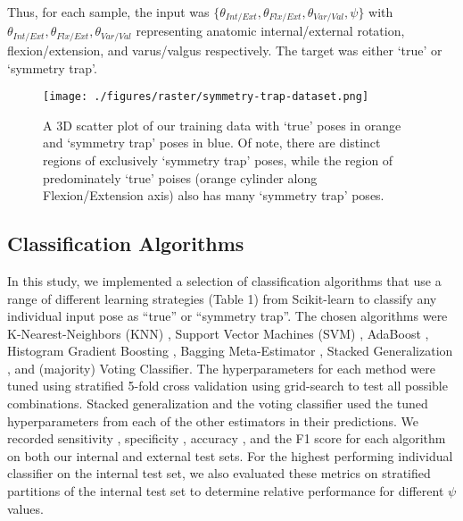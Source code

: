 Thus, for each sample, the input was $\{\theta_{Int/Ext}, \theta_{Flx/Ext}, \theta_{Var/Val}, \psi\}$ with $\theta_{Int/Ext}, \theta_{Flx/Ext}, \theta_{Var/Val}$ representing anatomic internal/external rotation, flexion/extension, and varus/valgus respectively. The target was either `true' or `symmetry trap'.

\begin{figure}[h!]
  \centering
  \texttt{[image: ./figures/raster/symmetry-trap-dataset.png]}
  \caption{A 3D scatter plot of our training data with `true' poses in orange and `symmetry trap' poses in blue. Of note, there are distinct regions of exclusively `symmetry trap' poses, while the region of predominately `true' poises (orange cylinder along Flexion/Extension axis) also has many `symmetry trap' poses.}
  \label{fig:sym-trap-dataset}
\end{figure}
\subsection{Classification Algorithms}
In this study, we implemented a selection of classification algorithms that use a range of different learning strategies (Table 1) from Scikit-learn \cite{scikit-learn} to classify any individual input pose as  ``true'' or ``symmetry trap''.
The chosen algorithms were K-Nearest-Neighbors (KNN) \cite{fixDiscriminatoryAnalysisNanparametric1951},
Support Vector Machines (SVM) \cite{cortesSupportvectorNetworks1995}, AdaBoost \cite{friedmanGreedyFunctionApproximation2001},
Histogram Gradient Boosting \cite{freundDecisionTheoreticGeneralizationOnLine1997},
Bagging Meta-Estimator \cite{breimanBaggingPredictors1996},
Stacked Generalization \cite{smythLinearlyCombiningDensity1999,wolpertStackedGeneralization1992},
and (majority) Voting Classifier.
The hyperparameters for each method were tuned using stratified 5-fold cross validation using grid-search to test all possible combinations.
Stacked generalization and the voting classifier used the tuned hyperparameters from each of the other estimators in their predictions.
We recorded sensitivity \cite{yerushalmyStatisticalProblemsAssessing1947}, specificity \cite{yerushalmyStatisticalProblemsAssessing1947}, accuracy \cite{internationalorganizationforstandardizationAccuracyTruenessPrecision2023},
and the F1 score \cite{tahaMetricsEvaluating3D2015} for each algorithm on both our internal and external test sets.
For the highest performing individual classifier on the internal test set, we also evaluated these metrics on stratified partitions of the internal test set to determine relative performance for different $\psi$ values.



